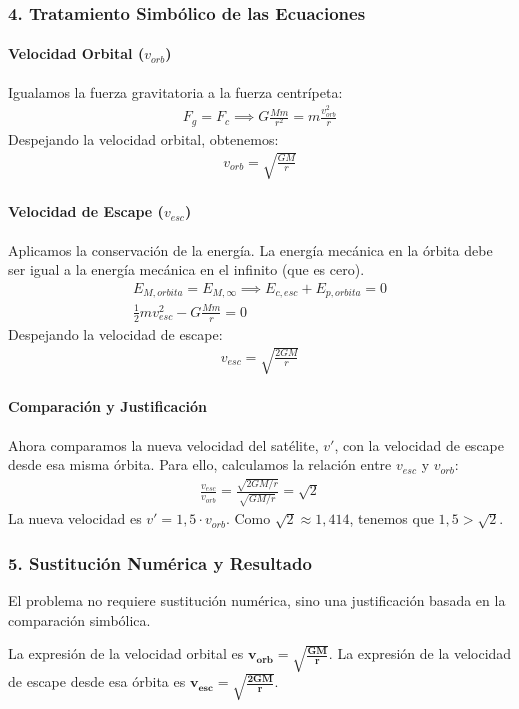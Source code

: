 \subsubsection*{4. Tratamiento Simbólico de las Ecuaciones}
\paragraph*{Velocidad Orbital ($v_{orb}$)}
Igualamos la fuerza gravitatoria a la fuerza centrípeta:
\begin{gather}
    F_g = F_c \implies G \frac{M m}{r^2} = m \frac{v_{orb}^2}{r}
\end{gather}
Despejando la velocidad orbital, obtenemos:
\begin{gather}
    v_{orb} = \sqrt{\frac{G M}{r}}
\end{gather}
\paragraph*{Velocidad de Escape ($v_{esc}$)}
Aplicamos la conservación de la energía. La energía mecánica en la órbita debe ser igual a la energía mecánica en el infinito (que es cero).
\begin{gather}
    E_{M,orbita} = E_{M,\infty} \implies E_{c,esc} + E_{p,orbita} = 0 \nonumber \\[8pt]
    \frac{1}{2} m v_{esc}^2 - G \frac{M m}{r} = 0
\end{gather}
Despejando la velocidad de escape:
\begin{gather}
    v_{esc} = \sqrt{\frac{2 G M}{r}}
\end{gather}
\paragraph*{Comparación y Justificación}
Ahora comparamos la nueva velocidad del satélite, $v'$, con la velocidad de escape desde esa misma órbita. Para ello, calculamos la relación entre $v_{esc}$ y $v_{orb}$:
\begin{gather}
    \frac{v_{esc}}{v_{orb}} = \frac{\sqrt{2 G M / r}}{\sqrt{G M / r}} = \sqrt{2}
\end{gather}
La nueva velocidad es $v' = 1,5 \cdot v_{orb}$. Como $\sqrt{2} \approx 1,414$, tenemos que $1,5 > \sqrt{2}$.

\subsubsection*{5. Sustitución Numérica y Resultado}
El problema no requiere sustitución numérica, sino una justificación basada en la comparación simbólica.
\begin{cajaresultado}
La expresión de la velocidad orbital es $\boldsymbol{v_{orb} = \sqrt{\frac{G M}{r}}}$. La expresión de la velocidad de escape desde esa órbita es $\boldsymbol{v_{esc} = \sqrt{\frac{2 G M}{r}}}$.
\end{cajaresultado}

